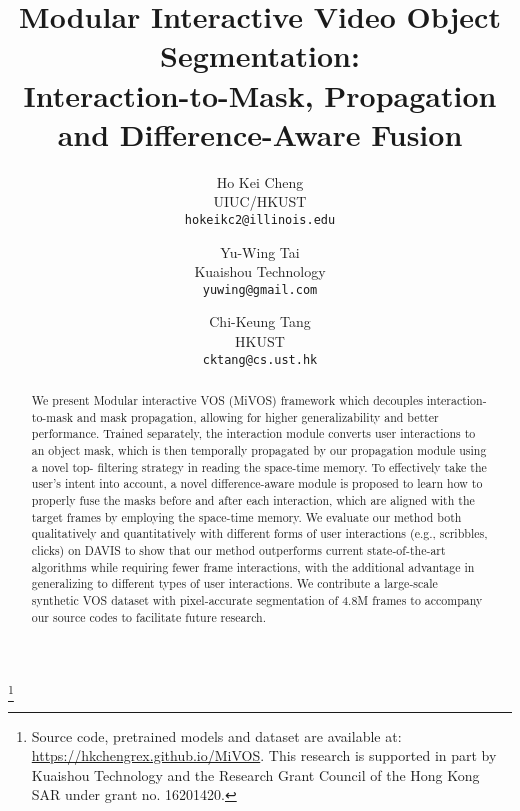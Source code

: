 \documentclass[final]{cvpr}
\newcommand\blfootnote[1]{\begingroup
	\renewcommand\thefootnote{}\footnote{#1}\addtocounter{footnote}{-1}\endgroup
}
\begin{document}
	
	
\title{Modular Interactive Video Object Segmentation: \\ Interaction-to-Mask, Propagation and Difference-Aware Fusion}
	
	\author{
		Ho Kei Cheng\\
		UIUC/HKUST\\
		{\tt\small hokeikc2@illinois.edu}
\and
		Yu-Wing Tai\\
		Kuaishou Technology\\
		{\tt\small yuwing@gmail.com}
		\and
		Chi-Keung Tang\\
		HKUST\\
		{\tt\small cktang@cs.ust.hk}
	}
	
	\maketitle
	
\begin{abstract}
		We present Modular interactive VOS (MiVOS) framework which decouples interaction-to-mask and mask propagation, allowing for higher generalizability and better performance. Trained separately, the interaction module converts user interactions to an object mask, which is then temporally propagated by our 
propagation module using a novel top- filtering strategy in reading the space-time memory. To effectively take the user's intent into account, a novel difference-aware module is proposed to learn how to properly fuse the masks before and after each interaction, which are aligned with the target frames by  employing the space-time memory.
		We evaluate our method both qualitatively and quantitatively with different forms of user interactions (e.g., scribbles, clicks) on DAVIS to show that our method outperforms current state-of-the-art algorithms while requiring fewer frame interactions, with the additional advantage in generalizing to different types of user interactions.
		We contribute a large-scale synthetic VOS dataset with pixel-accurate segmentation of 4.8M frames to accompany our source codes to facilitate future research.
	\end{abstract}
	
	\vspace{-2.1em}
	
	\blfootnote{Source code, pretrained models and dataset are available at:  {\url{https://hkchengrex.github.io/MiVOS}}. This research is supported in part by Kuaishou Technology and the Research Grant Council of the Hong Kong SAR under grant no. 16201420.}
	
\end{document}
